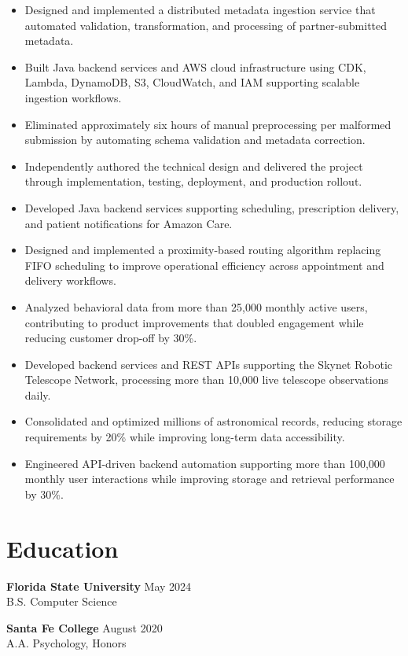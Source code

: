 \documentclass[10pt,letterpaper]{article}
\begin{document}
\vspace{3pt}


\begin{itemize}
\item Designed and implemented a distributed metadata ingestion service that automated validation, transformation, and processing of partner-submitted metadata.
\item Built Java backend services and AWS cloud infrastructure using CDK, Lambda, DynamoDB, S3, CloudWatch, and IAM supporting scalable ingestion workflows.
\item Eliminated approximately six hours of manual preprocessing per malformed submission by automating schema validation and metadata correction.
\item Independently authored the technical design and delivered the project through implementation, testing, deployment, and production rollout.
\end{itemize}

\vspace{3pt}


\begin{itemize}
\item Developed Java backend services supporting scheduling, prescription delivery, and patient notifications for Amazon Care.
\item Designed and implemented a proximity-based routing algorithm replacing FIFO scheduling to improve operational efficiency across appointment and delivery workflows.
\item Analyzed behavioral data from more than 25,000 monthly active users, contributing to product improvements that doubled engagement while reducing customer drop-off by 30\%.
\end{itemize}

\vspace{3pt}


\begin{itemize}
\item Developed backend services and REST APIs supporting the Skynet Robotic Telescope Network, processing more than 10,000 live telescope observations daily.
\item Consolidated and optimized millions of astronomical records, reducing storage requirements by 20\% while improving long-term data accessibility.
\item Engineered API-driven backend automation supporting more than 100,000 monthly user interactions while improving storage and retrieval performance by 30\%.
\end{itemize}

\section*{Education}

\textbf{Florida State University} \hfill May 2024 \\
B.S. Computer Science

\vspace{3pt}

\textbf{Santa Fe College} \hfill August 2020  \\
A.A. Psychology, Honors
\end{document}
